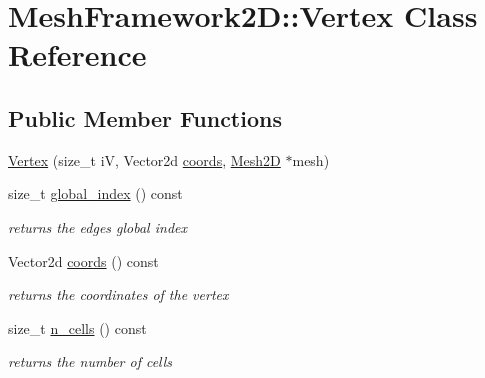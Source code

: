 \hypertarget{classMeshFramework2D_1_1Vertex}{}\section{Mesh\+Framework2D\+:\+:Vertex Class Reference}
\label{classMeshFramework2D_1_1Vertex}
\subsection*{Public Member Functions}
\begin{DoxyCompactItemize}
\item 
\hyperlink{classMeshFramework2D_1_1Vertex_ae7a124df57a1c34455041e9fbe56ac06}{Vertex} (size\+\_\+t iV, Vector2d \hyperlink{classMeshFramework2D_1_1Vertex_af4ade039be74f1cce317dedcf81e1ec3}{coords}, \hyperlink{classMeshFramework2D_1_1Mesh2D}{Mesh2D} $\ast$mesh)
\item 
\mbox{\label{classMeshFramework2D_1_1Vertex_a7c7bba6f251edfa71eb1e6d521caa1de}} 
size\+\_\+t \hyperlink{classMeshFramework2D_1_1Vertex_a7c7bba6f251edfa71eb1e6d521caa1de}{global\+\_\+index} () const
\begin{DoxyCompactList}\small\item\em returns the edges global index \end{DoxyCompactList}\item 
\mbox{\label{classMeshFramework2D_1_1Vertex_af4ade039be74f1cce317dedcf81e1ec3}} 
Vector2d \hyperlink{classMeshFramework2D_1_1Vertex_af4ade039be74f1cce317dedcf81e1ec3}{coords} () const
\begin{DoxyCompactList}\small\item\em returns the coordinates of the vertex \end{DoxyCompactList}\item 
\mbox{\label{classMeshFramework2D_1_1Vertex_ac6eb3a44e3a0125d32510a3b70b66d5c}} 
size\+\_\+t \hyperlink{classMeshFramework2D_1_1Vertex_ac6eb3a44e3a0125d32510a3b70b66d5c}{n\+\_\+cells} () const
\begin{DoxyCompactList}\small\item\em returns the number of cells \end{DoxyCompactList}\item 
\mbox{\label{classMeshFramework2D_1_1Vertex_a5ce07474f650f77d9c62811692ccda77}} 

\end{DoxyCompactItemize}
